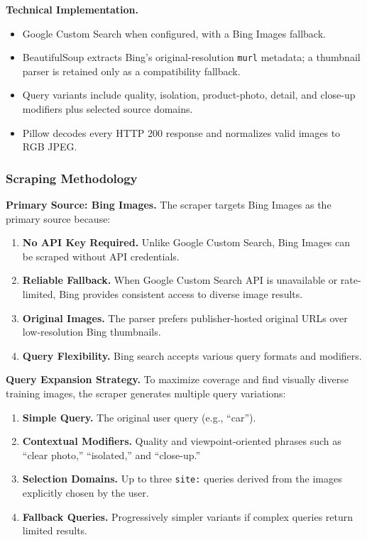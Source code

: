 \documentclass[12pt, letterpaper]{article}
\newcommand{\code}[1]{\texttt{\small\colorbox{codebg}{#1}}}
\begin{document}
\textbf{Technical Implementation.}
\begin{itemize}
  \item Google Custom Search when configured, with a Bing Images fallback.
  \item BeautifulSoup extracts Bing's original-resolution \code{murl} metadata; a
    thumbnail parser is retained only as a compatibility fallback.
  \item Query variants include quality, isolation, product-photo, detail, and close-up
    modifiers plus selected source domains.
  \item Pillow decodes every HTTP 200 response and normalizes valid images to RGB JPEG.
\end{itemize}

\subsubsection{Scraping Methodology}

\textbf{Primary Source: Bing Images.} The scraper targets Bing Images as the primary source because:
\begin{enumerate}
  \item \textbf{No API Key Required.} Unlike Google Custom Search, Bing Images can be scraped without API credentials.
  \item \textbf{Reliable Fallback.} When Google Custom Search API is unavailable or rate-limited, Bing provides
    consistent access to diverse image results.
  \item \textbf{Original Images.} The parser prefers publisher-hosted original URLs over
    low-resolution Bing thumbnails.
  \item \textbf{Query Flexibility.} Bing search accepts various query formats and modifiers.
\end{enumerate}

\textbf{Query Expansion Strategy.} To maximize coverage and find visually diverse training images, the scraper
generates multiple query variations:
\begin{enumerate}
  \item \textbf{Simple Query.} The original user query (e.g., ``car'').
  \item \textbf{Contextual Modifiers.} Quality and viewpoint-oriented phrases such as
    ``clear photo,'' ``isolated,'' and ``close-up.''
  \item \textbf{Selection Domains.} Up to three \code{site:} queries derived from the
    images explicitly chosen by the user.
  \item \textbf{Fallback Queries.} Progressively simpler variants if complex queries return limited results.
\end{enumerate}
\end{document}
